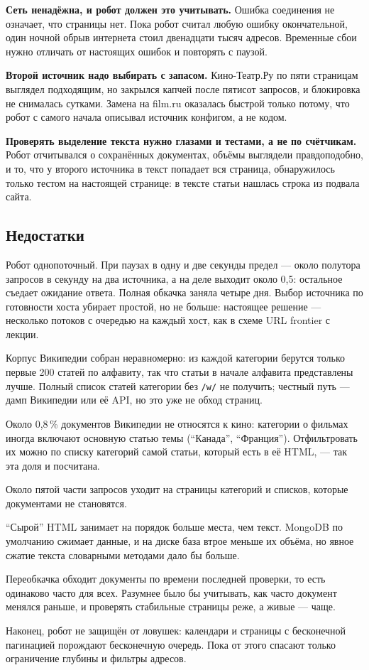 \textbf{Сеть ненадёжна, и робот должен это учитывать.} Ошибка соединения не
означает, что страницы нет. Пока робот считал любую ошибку окончательной, один
ночной обрыв интернета стоил двенадцати тысяч адресов. Временные сбои нужно
отличать от настоящих ошибок и повторять с паузой.

\textbf{Второй источник надо выбирать с запасом.} Кино-Театр.Ру по пяти
страницам выглядел подходящим, но закрылся капчей после пятисот запросов, и
блокировка не снималась сутками. Замена на film.ru оказалась быстрой
только потому, что робот с самого начала описывал источник конфигом, а не
кодом.

\textbf{Проверять выделение текста нужно глазами и тестами, а не по
счётчикам.} Робот отчитывался о сохранённых документах, объёмы выглядели
правдоподобно, и то, что у второго источника в текст попадает вся страница,
обнаружилось только тестом на настоящей странице: в тексте статьи нашлась
строка из подвала сайта.

\subsection*{Недостатки}

Робот однопоточный. При паузах в одну и две секунды предел --- около полутора
запросов в секунду на два источника, а на деле выходит около 0,5: остальное
съедает ожидание ответа. Полная обкачка заняла четыре дня. Выбор источника по
готовности хоста убирает простой, но не больше: настоящее решение --- несколько
потоков с очередью на каждый хост, как в схеме URL frontier с лекции.

Корпус Википедии собран неравномерно: из каждой категории берутся только первые
200 статей по алфавиту, так что статьи в начале алфавита представлены лучше.
Полный список статей категории без \texttt{/w/} не получить; честный путь ---
дамп Википедии или её API, но это уже не обход страниц.

Около 0,8\,\% документов Википедии не относятся к кино: категории о фильмах
иногда включают основную статью темы (\enquote{Канада}, \enquote{Франция}).
Отфильтровать их можно по списку категорий самой статьи, который есть в её
HTML, --- так эта доля и посчитана.

Около пятой части запросов уходит на страницы категорий и списков, которые
документами не становятся.

\enquote{Сырой} HTML занимает на порядок больше места, чем текст. MongoDB
по умолчанию сжимает данные, и на диске база втрое меньше их объёма, но
явное сжатие текста словарными методами дало бы больше.

Переобкачка обходит документы по времени последней проверки, то есть одинаково
часто для всех. Разумнее было бы учитывать, как часто документ менялся раньше, и
проверять стабильные страницы реже, а живые --- чаще.

Наконец, робот не защищён от ловушек: календари и страницы с бесконечной
пагинацией порождают бесконечную очередь. Пока от этого спасают только
ограничение глубины и фильтры адресов.

\pagebreak

